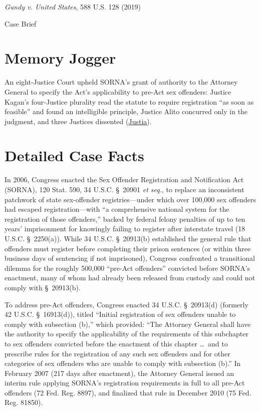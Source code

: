 \documentclass[12pt]{article}
\begin{document}
\begin{center}
{\LARGE \textit{Gundy v. United States}, 588 U.S. 128 (2019)\par}
\vspace{0.8em}
{\large Case Brief\par}
\end{center}
\vspace{1em}

\section{Memory Jogger}
An eight-Justice Court upheld SORNA's grant of authority to the Attorney General to specify the Act's applicability to pre-Act sex offenders: Justice Kagan's four-Justice plurality read the statute to require registration ``as soon as feasible'' and found an intelligible principle, Justice Alito concurred only in the judgment, and three Justices dissented (\href{https://supreme.justia.com/cases/federal/us/588/17-6086/}{Justia}).

\section{Detailed Case Facts}
In 2006, Congress enacted the Sex Offender Registration and Notification Act (SORNA), 120 Stat. 590, 34 U.S.C. \S~20901 \textit{et seq.}, to replace an inconsistent patchwork of state sex-offender registries---under which over 100,000 sex offenders had escaped registration---with ``a comprehensive national system for the registration of those offenders,'' backed by federal felony penalties of up to ten years' imprisonment for knowingly failing to register after interstate travel (18 U.S.C. \S~2250(a)). While 34 U.S.C. \S~20913(b) established the general rule that offenders must register before completing their prison sentences (or within three business days of sentencing if not imprisoned), Congress confronted a transitional dilemma for the roughly 500,000 ``pre-Act offenders'' convicted before SORNA's enactment, many of whom had already been released from custody and could not comply with \S~20913(b).

To address pre-Act offenders, Congress enacted 34 U.S.C. \S~20913(d) (formerly 42 U.S.C. \S~16913(d)), titled ``Initial registration of sex offenders unable to comply with subsection (b),'' which provided: ``The Attorney General shall have the authority to specify the applicability of the requirements of this subchapter to sex offenders convicted before the enactment of this chapter \dots\ and to prescribe rules for the registration of any such sex offenders and for other categories of sex offenders who are unable to comply with subsection (b).'' In February 2007 (217 days after enactment), the Attorney General issued an interim rule applying SORNA's registration requirements in full to all pre-Act offenders (72 Fed. Reg. 8897), and finalized that rule in December 2010 (75 Fed. Reg. 81850).
\end{document}
